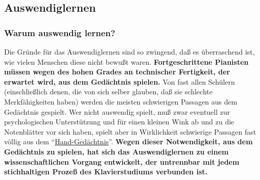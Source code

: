 
\subsection{Auswendiglernen}
\label{c1iii6} 

\subsubsection{Warum auswendig lernen?}
\label{c1iii6a}

Die Gründe für das Auswendiglernen sind so zwingend, daß es überraschend ist, wie vielen Menschen diese nicht bewußt waren.
\textbf{Fortgeschrittene Pianisten müssen wegen des hohen Grades an technischer Fertigkeit, der erwartet wird, aus dem Gedächtnis spielen.}
Von fast allen Schülern (einschließlich denen, die von sich selber glauben, daß sie schlechte Merkfähigkeiten haben) werden die meisten schwierigen Passagen aus dem Gedächtnis gespielt.
Wer nicht auswendig spielt, muß zwar eventuell zur psychologischen Unterstützung und für einen kleinen Wink ab und zu die Notenblätter vor sich haben, spielt aber in Wirklichkeit schwierige Passagen fast völlig aus dem \enquote{\hyperref[c1iii6d]{Hand-Gedächtnis}}.
\textbf{Wegen dieser Notwendigkeit, aus dem Gedächtnis zu spielen, hat sich das Auswendiglernen zu einem wissenschaftlichen Vorgang entwickelt, der untrennbar mit jedem stichhaltigen Prozeß des Klavierstudiums verbunden ist.}

